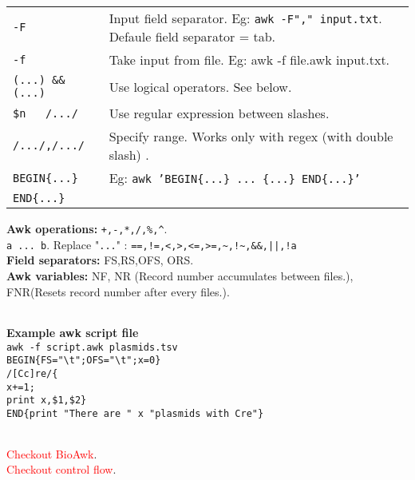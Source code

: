 \begin{tabularx}{\linewidth}{lX}

\texttt{-F} & Input field separator. Eg: \texttt{awk -F"," input.txt}. Defaule field separator = tab.\\
\texttt{-f} & Take input from file. Eg: awk -f file.awk input.txt.\\
\texttt{(...) \&\& (...)} &  Use logical operators. See below.\\
\texttt{\$n ~ /.../} & Use regular expression between slashes.\\
\texttt{/.../,/.../} & Specify range. Works only with regex (with double slash) .\\
\texttt{BEGIN\{...\}} & Eg: \texttt{awk 'BEGIN\{...\} ... \{...\} END\{...\}'}\\
\texttt{END\{...\}} & \\
\hline
\end{tabularx}
\textbf{Awk operations:} \texttt{+,-,*,/,\%,\^{}}. \\
\texttt{a ... b}. Replace "\texttt{...}" : \texttt{==,!=,<,>,<=,>=,\~{},!\~{},\&\&,||,!a}\\
\textbf{Field separators:} FS,RS,OFS, ORS.\\
\textbf{Awk variables:} NF, NR (Record number accumulates between files.), FNR(Resets record number after every files.).\\

\begin{tabularx}{\linewidth}{lX}
\hline
\end{tabularx}

\textbf{Example awk script file}\\
\texttt{awk -f script.awk plasmids.tsv}\\
\texttt{BEGIN\{FS="\textbackslash t";OFS="\textbackslash t";x=0\}}\\
\texttt{/[Cc]re/\{}\\
\texttt{x+=1;}\\
\texttt{print x,\$1,\$2\}}\\
\texttt{END\{print "There are " x "plasmids with Cre"\}}

\begin{tabularx}{\linewidth}{lX}
\hline
\end{tabularx}

\textcolor{red}{Checkout BioAwk}.\\
\textcolor{red}{Checkout control flow}.\\
\begin{tabularx}{\linewidth}{lX}
\hline
\end{tabularx}

